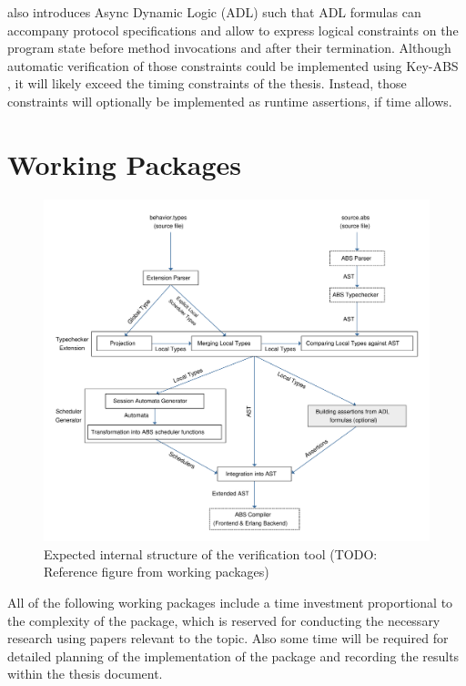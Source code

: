 \documentclass[paper=a4,nochapname,accentcolor=tud9c]{tudexercise}
\begin{document}

\cite{kamburjan2018stateful} also introduces Async Dynamic Logic (ADL) such that ADL formulas can
accompany protocol specifications and allow to express logical constraints on the
program state before method invocations and after their termination.
Although automatic verification of those constraints could  be implemented using
Key-ABS \cite{din2015key}, it will likely exceed the timing constraints of the thesis.
Instead, those constraints will optionally be implemented as runtime assertions,
if time allows.

\section{Working Packages}\label{workpackages}
%
\begin{figure}[H]
  \centering
  \includegraphics[width=\linewidth]{assets/architecture.pdf}
  \caption{Expected internal structure of the verification tool (TODO: Reference figure from working packages)}
\end{figure}

All of the following working packages include a time investment proportional to the
complexity of the package, which is reserved for conducting the necessary
research using papers relevant to the topic. Also some time will be required for
detailed planning of the implementation of the package and recording the results
within the thesis document.
\end{document}
